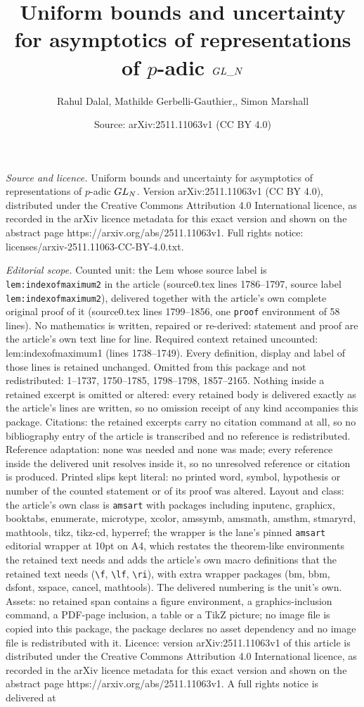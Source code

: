 \documentclass[10pt,a4paper]{amsart}
\title[Uniform bounds and uncertainty for asymptotics of representa]{Uniform bounds and uncertainty for asymptotics of representations of $p$-adic ${\rm GL}\_N$}
\author{Rahul Dalal, Mathilde Gerbelli-Gauthier,, Simon Marshall}
\date{Source: arXiv:2511.11063v1 (CC BY 4.0)}
\begin{document}
\maketitle

\noindent\emph{Source and licence.} Uniform bounds and uncertainty for asymptotics of representations of $p$-adic ${\rm GL}_N$. Version arXiv:2511.11063v1 (CC BY 4.0), distributed under the Creative Commons Attribution 4.0 International licence, as recorded in the arXiv licence metadata for this exact version and shown on the abstract page https://arxiv.org/abs/2511.11063v1. Full rights notice: licenses/arxiv-2511.11063-CC-BY-4.0.txt.\par\smallskip

\noindent\textit{Editorial scope.} Counted unit: the Lem whose source label is \texttt{lem:indexofmaximum2} in the article (source0.tex lines 1786--1797, source label \texttt{lem:indexofmaximum2}), delivered together with the article's own complete original proof of it (source0.tex lines 1799--1856, one \texttt{proof} environment of 58 lines). No mathematics is written, repaired or re-derived: statement and proof are the article's own text line for line. Required context retained uncounted: lem:indexofmaximum1 (lines 1738--1749). Every definition, display and label of those lines is retained unchanged. Omitted from this package and not redistributed: 1--1737, 1750--1785, 1798--1798, 1857--2165. Nothing inside a retained excerpt is omitted or altered: every retained body is delivered exactly as the article's lines are written, so no omission receipt of any kind accompanies this package. Citations: the retained excerpts carry no citation command at all, so no bibliography entry of the article is transcribed and no reference is redistributed. Reference adaptation: none was needed and none was made; every reference inside the delivered unit resolves inside it, so no unresolved reference or citation is produced. Printed slips kept literal: no printed word, symbol, hypothesis or number of the counted statement or of its proof was altered. Layout and class: the article's own class is \texttt{amsart} with packages including inputenc, graphicx, booktabs, enumerate, microtype, xcolor, amssymb, amsmath, amsthm, stmaryrd, mathtools, tikz, tikz-cd, hyperref; the wrapper is the lane's pinned \texttt{amsart} editorial wrapper at 10pt on A4, which restates the theorem-like environments the retained text needs and adds the article's own macro definitions that the retained text needs (\texttt{\textbackslash f}, \texttt{\textbackslash lf}, \texttt{\textbackslash ri}), with extra wrapper packages (bm, bbm, dsfont, xspace, cancel, mathtools). The delivered numbering is the unit's own. Assets: no retained span contains a figure environment, a graphics-inclusion command, a PDF-page inclusion, a table or a TikZ picture; no image file is copied into this package, the package declares no asset dependency and no image file is redistributed with it. Licence: version arXiv:2511.11063v1 of this article is distributed under the Creative Commons Attribution 4.0 International licence, as recorded in the arXiv licence metadata for this exact version and shown on the abstract page https://arxiv.org/abs/2511.11063v1. A full rights notice is delivered at 
\end{document}
